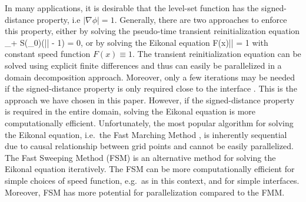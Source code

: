In many applications, it is desirable that the level-set function has the signed-distance property, i.e $|\nabla \phi| = 1$. Generally, there are two approaches to enforce this property, either by solving the pseudo-time transient reinitialization equation \cite{Sussman;Smereka;Osher:94:A-Level-Set-Approach, Osher;Fedkiw:01:Level-Set-Methods:-A}
\ben
\phi_\tau + S(\phi_0)\left(|\nabla \phi| - 1\right) = 0,
\een
or by solving the Eikonal equation
\ben
F(x)|\nabla\phi| = 1
\een 
with constant speed function $F(x) \equiv 1$. The transient reinitialization equation can be solved using explicit finite differences and thus can easily be parallelized in a domain decomposition approach. Moreover, only a few iterations may be needed if the signed-distance property is only required close to the interface \cite{Min;Gibou:07:A-second-order-accur}. This is the approach we have chosen in this paper. However, if the signed-distance property is required in the entire domain, solving the Eikonal equation is more computationally efficient. Unfortunately, the most popular algorithm for solving the Eikonal equation, i.e.\ the Fast Marching Method \cite{Sethian:96:A-Fast-Marching-Leve,Sethian:99:Level-set-methods-an}, is inherently sequential due to causal relationship between grid points and cannot be easily parallelized. The Fast Sweeping Method (FSM) \cite{Zhao:05:A-fast-sweeping-meth} is an alternative method for solving the Eikonal equation iteratively. The FSM can be more computationally efficient for simple choices of speed function, e.g.\ as in this context, and for simple interfaces. Moreover, FSM has more potential for parallelization compared to the FMM.

